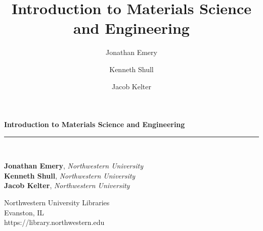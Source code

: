 \documentclass{book}
\title{Introduction to Materials Science and Engineering}
\author{Jonathan Emery \and Kenneth Shull \and Jacob Kelter}
\begin{document}
\frontmatter

\begin{titlepage}
\begin{flushleft}

\textbf{\fontsize{48}{54}\selectfont Introduction to Materials Science and
Engineering \\}
\textbf{\large \textit{}}

\par\noindent\rule{\textwidth}{4pt}\\

\begin{flushright}

      \textbf{Jonathan Emery}, \emph{Northwestern University}\\
      \textbf{Kenneth Shull}, \emph{Northwestern University}\\
      \textbf{Jacob Kelter}, \emph{Northwestern University}\\
  
\end{flushright}

\vspace{\fill}

\end{flushleft}
\begin{center}
  \small{Northwestern University Libraries\\
  Evanston, IL\\
  https://library.northwestern.edu}
\end{center}
  
\end{titlepage}
\restoregeometry

\thispagestyle{empty}
\end{document}
